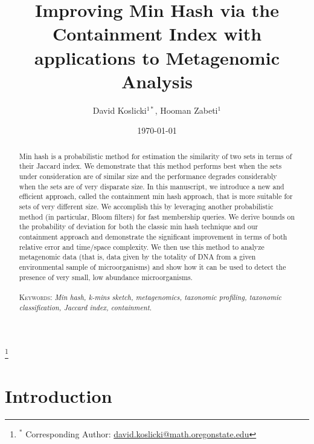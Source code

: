 \documentclass[11pt,reqno]{amsart}
\theoremstyle{remark}
\numberwithin{equation}{section}
\begin{document}
\title[Improving Min Hash]{Improving Min Hash via the Containment Index with applications to Metagenomic Analysis} %


\author{David Koslicki${}^{1*}$, Hooman Zabeti${}^{1}$}
\address{${}^1$ Mathematics Department, Oregon State University, Corvallis, OR.}
\thanks{${}^*$ Corresponding Author: \url{david.koslicki@math.oregonstate.edu}}





\date{\today}
\begin{abstract}
Min hash is a probabilistic method for estimation the similarity of two sets in terms of their Jaccard index. We demonstrate that this method performs best when the sets under consideration are of similar size and the performance degrades considerably when the sets are of very disparate size. In this manuscript, we introduce a new and efficient approach, called the containment min hash approach, that is more suitable for sets of very different size. We accomplish this by leveraging another probabilistic method (in particular, Bloom filters) for fast membership queries. We derive bounds on the probability of deviation for both the classic min hash technique and our containment approach and demonstrate the significant improvement in terms of both relative error and time/space complexity. We then use this method to analyze metagenomic data (that is, data given by the totality of DNA from a given environmental sample of microorganisms) and show how it can be used to detect the presence of very small, low abundance microorganisms.  \\\\
\smallskip
\noindent \textsc{Keywords}: \emph{Min hash, k-mins sketch, metagenomics, taxonomic profiling, taxonomic classification, Jaccard index, containment}.
\end{abstract}
\maketitle


\section{Introduction}
\end{document}
